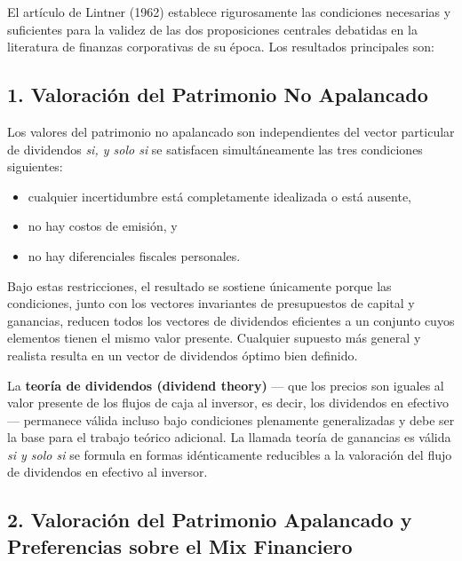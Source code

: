 \documentclass[12pt]{article}
\begin{document}
El art\'iculo de Lintner (1962) establece rigurosamente las condiciones necesarias y suficientes para la validez de las dos proposiciones centrales debatidas en la literatura de finanzas corporativas de su \'epoca. Los resultados principales son:

\subsection*{1. Valoraci\'on del Patrimonio No Apalancado}

Los valores del patrimonio no apalancado son independientes del vector particular de dividendos \textit{si, y solo si} se satisfacen simult\'aneamente las tres condiciones siguientes:
\begin{itemize}
  \item[(1)] cualquier incertidumbre est\'a completamente idealizada o est\'a ausente,
  \item[(2)] no hay costos de emisi\'on, y
  \item[(3)] no hay diferenciales fiscales personales.
\end{itemize}

Bajo estas restricciones, el resultado se sostiene \'unicamente porque las condiciones, junto con los vectores invariantes de presupuestos de capital y ganancias, reducen todos los vectores de dividendos eficientes a un conjunto cuyos elementos tienen el mismo valor presente. Cualquier supuesto m\'as general y realista resulta en un vector de dividendos \'optimo bien definido.

La \textbf{teor\'ia de dividendos (dividend theory)} --- que los precios son iguales al valor presente de los flujos de caja al inversor, es decir, los dividendos en efectivo --- permanece v\'alida incluso bajo condiciones plenamente generalizadas y debe ser la base para el trabajo te\'orico adicional. La llamada teor\'ia de ganancias es v\'alida \textit{si y solo si} se formula en formas id\'enticamente reducibles a la valoraci\'on del flujo de dividendos en efectivo al inversor.

\subsection*{2. Valoraci\'on del Patrimonio Apalancado y Preferencias sobre el Mix Financiero}
\end{document}
